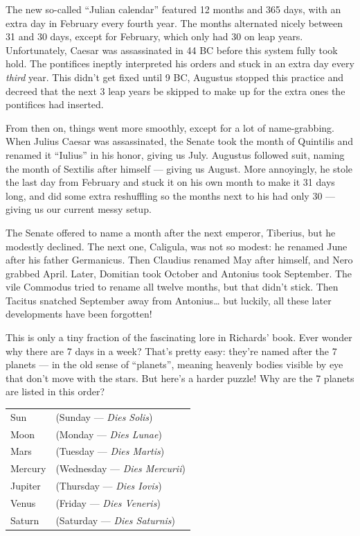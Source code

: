 \documentclass{article}
\begin{document}
The new so-called ``Julian calendar'' featured 12 months and 365 days,
with an extra day in February every fourth year. The months alternated
nicely between 31 and 30 days, except for February, which only had 30 on
leap years. Unfortunately, Caesar was assassinated in 44 BC before this
system fully took hold. The pontifices ineptly interpreted his orders
and stuck in an extra day every \emph{third} year. This didn't get fixed
until 9 BC, Augustus stopped this practice and decreed that the next 3
leap years be skipped to make up for the extra ones the pontifices had
inserted.

From then on, things went more smoothly, except for a lot of
name-grabbing. When Julius Caesar was assassinated, the Senate took the
month of Quintilis and renamed it ``Iulius'' in his honor, giving us
July. Augustus followed suit, naming the month of Sextilis after himself
--- giving us August. More annoyingly, he stole the last day from
February and stuck it on his own month to make it 31 days long, and did
some extra reshuffling so the months next to his had only 30 --- giving
us our current messy setup.

The Senate offered to name a month after the next emperor, Tiberius, but
he modestly declined. The next one, Caligula, was not so modest: he
renamed June after his father Germanicus. Then Claudius renamed May
after himself, and Nero grabbed April. Later, Domitian took October and
Antonius took September. The vile Commodus tried to rename all twelve
months, but that didn't stick. Then Tacitus snatched September away from
Antonius\ldots{} but luckily, all these later developments have been
forgotten!

This is only a tiny fraction of the fascinating lore in Richards' book.
Ever wonder why there are 7 days in a week? That's pretty easy: they're
named after the 7 planets --- in the old sense of ``planets'', meaning
heavenly bodies visible by eye that don't move with the stars. But
here's a harder puzzle! Why are the 7 planets are listed in this order?

\begin{longtable}[]{@{}ll@{}}
\toprule
\endhead
Sun & (Sunday --- \emph{Dies Solis})\tabularnewline
Moon & (Monday --- \emph{Dies Lunae})\tabularnewline
Mars & (Tuesday --- \emph{Dies Martis})\tabularnewline
Mercury & (Wednesday --- \emph{Dies Mercurii})\tabularnewline
Jupiter & (Thursday --- \emph{Dies Iovis})\tabularnewline
Venus & (Friday --- \emph{Dies Veneris})\tabularnewline
Saturn & (Saturday --- \emph{Dies Saturnis})\tabularnewline
\bottomrule
\end{longtable}
\end{document}
